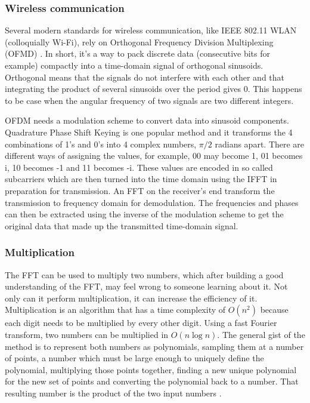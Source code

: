 
\subsubsection{Wireless communication}
Several modern standards for wireless communication, like IEEE 802.11 WLAN (colloquially Wi-Fi), rely on Orthogonal Frequency Division Multiplexing (OFMD) \cite{GnanishivaramNeeraja2014}. In short, it's a way to pack discrete data (consecutive bits for example) compactly into a time-domain signal of orthogonal sinusoids. Orthogonal means that the signals do not interfere with each other and that integrating the product of several sinusoids over the period gives 0. This happens to be case when the angular frequency of two signals are two different integers. 

OFDM needs a modulation scheme to convert data into sinusoid components. Quadrature Phase Shift Keying is one popular method and it transforms the 4 combinations of 1's and 0's into 4 complex numbers, $\pi/2$ radians apart. There are different ways of assigning the values, for example, 00 may become 1, 01 becomes i, 10 becomes -1 and 11 becomes -i. These values are encoded in so called subcarriers which are then turned into the time domain using the IFFT in preparation for transmission. An FFT on the receiver's end transform the transmission to frequency domain for demodulation. The frequencies and phases can then be extracted using the inverse of the modulation scheme to get the original data that made up the transmitted time-domain signal.

\subsubsection{Multiplication}
The FFT can be used to multiply two numbers, which after building a good understanding of the FFT, may feel wrong to someone learning about it. Not only can it perform multiplication, it can increase the efficiency of it. Multiplication is an algorithm that has a time complexity of $O(n^2)$ because each digit needs to be multiplied by every other digit. Using a fast Fourier transform, two numbers can be multiplied in $O(n \log n)$. The general gist of the method is to represent both numbers as polynomials, sampling them at a number of points, a number which must be large enough to uniquely define the polynomial, multiplying those points together, finding a new unique polynomial for the new set of points and converting the polynomial back to a number. That resulting number is the product of the two input numbers \cite{Reducible2020}. 


